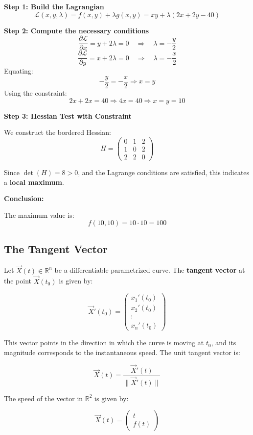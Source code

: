 \textbf{Step 1: Build the Lagrangian}
\[
\mathcal{L}(x, y, \lambda) = f(x, y) + \lambda g(x, y) = xy + \lambda (2x + 2y - 40)
\]

\textbf{Step 2: Compute the necessary conditions}
\[
\frac{\partial \mathcal{L}}{\partial x} = y + 2\lambda = 0 \quad \Rightarrow \quad \lambda = -\frac{y}{2}
\]
\[
\frac{\partial \mathcal{L}}{\partial y} = x + 2\lambda = 0 \quad \Rightarrow \quad \lambda = -\frac{x}{2}
\]
Equating:
\[
-\frac{y}{2} = -\frac{x}{2} \Rightarrow x = y
\]
Using the constraint:
\[
2x + 2x = 40 \Rightarrow 4x = 40 \Rightarrow x = y = 10
\]

\textbf{Step 3: Hessian Test with Constraint}

We construct the bordered Hessian:
\[
H = \begin{pmatrix}
0 & 1 & 2 \\
1 & 0 & 2 \\
2 & 2 & 0
\end{pmatrix}
\]

Since \( \det(H) = 8 > 0 \), and the Lagrange conditions are satisfied, this indicates a \textbf{local maximum}.

\textbf{Conclusion:}

The maximum value is:
\[
f(10, 10) = 10 \cdot 10 = \boxed{100}
\]


\subsection{The Tangent Vector}

Let \( \vec{X}(t) \in \mathbb{R}^n \) be a differentiable parametrized curve. The \textbf{tangent vector} at the point \( \vec{X}(t_0) \) is given by:

\[
\vec{X}'(t_0) = \begin{pmatrix}
    x_1 ' (t_0) \\ x_2 ' (t_0) \\ \vdots \\ x_n ' (t_0)
\end{pmatrix}
\]

This vector points in the direction in which the curve is moving at \( t_0 \), and its magnitude corresponds to the instantaneous speed. The unit tangent vector is:

\[
\vec{X}(t) = \frac{\vec{X}'(t)}{\|\vec{X}'(t)\|}
\]

The speed of the vector in \(\mathbb{R}^2\) is given by:

\[
\vec{X}(t) = \begin{pmatrix}
    t \\ f(t)
\end{pmatrix}
\]

